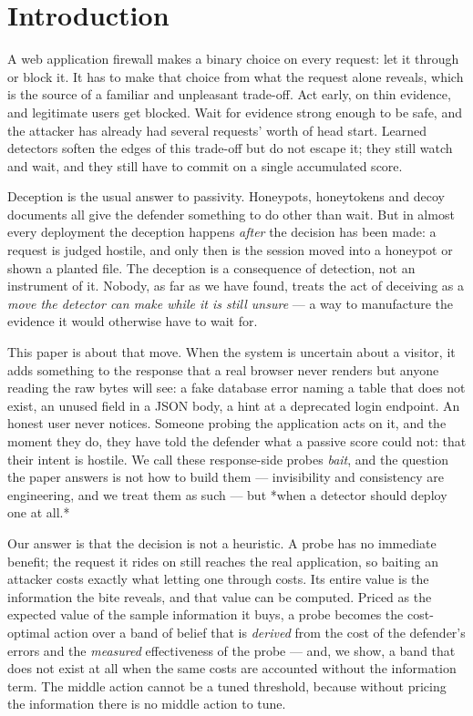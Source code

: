 
\section{Introduction}

A web application firewall makes a binary choice on every request: let it through
or block it. It has to make that choice from what the request alone reveals, which
is the source of a familiar and unpleasant trade-off. Act early, on thin evidence,
and legitimate users get blocked. Wait for evidence strong enough to be safe, and
the attacker has already had several requests' worth of head start. Learned
detectors soften the edges of this trade-off but do not escape it; they still
watch and wait, and they still have to commit on a single accumulated score.

Deception is the usual answer to passivity. Honeypots, honeytokens and decoy
documents all give the defender something to do other than wait. But in almost
every deployment the deception happens \emph{after} the decision has been made: a
request is judged hostile, and only then is the session moved into a honeypot or
shown a planted file. The deception is a consequence of detection, not an
instrument of it. Nobody, as far as we have found, treats the act of deceiving as
a \emph{move the detector can make while it is still unsure} --- a way to manufacture the
evidence it would otherwise have to wait for.

This paper is about that move. When the system is uncertain about a visitor, it
adds something to the response that a real browser never renders but anyone
reading the raw bytes will see: a fake database error naming a table that does not
exist, an unused field in a JSON body, a hint at a deprecated login endpoint. An
honest user never notices. Someone probing the application acts on it, and the
moment they do, they have told the defender what a passive score could not: that
their intent is hostile. We call these response-side probes \emph{bait}, and the
question the paper answers is not how to build them --- invisibility and
consistency are engineering, and we treat them as such --- but *when a detector
should deploy one at all.*

Our answer is that the decision is not a heuristic. A probe has no immediate
benefit; the request it rides on still reaches the real application, so baiting an
attacker costs exactly what letting one through costs. Its entire value is the
information the bite reveals, and that value can be computed. Priced as the
expected value of the sample information it buys, a probe becomes the cost-optimal
action over a band of belief that is \emph{derived} from the cost of the defender's
errors and the \emph{measured} effectiveness of the probe --- and, we show, a band that
does not exist at all when the same costs are accounted without the information
term. The middle action cannot be a tuned threshold, because without pricing the
information there is no middle action to tune.



